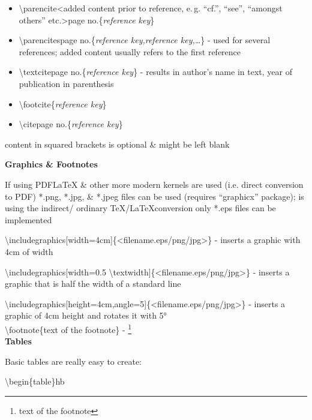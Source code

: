 \documentclass[a4paper,12pt,final]{article}
\begin{document}
\begin{itemize}
	\item \textbackslash parencite\lbrack <added content prior to reference, e.\,g. ``cf.'', ``see'', ``amongst others'' etc.>\rbrack\lbrack page no.\rbrack\{\textsl{reference key}\}
	\item \textbackslash parencites\lbrack<added content prior to reference>\rbrack \lbrack page no.\rbrack\{\textsl{reference key,reference key,\ldots}\} - used for several references; added content usually refers to the first reference 
	\item \textbackslash textcite\lbrack<added content prior to reference>\rbrack \lbrack page no.\rbrack\{\textsl{reference key}\} - results in author's name in text, year of publication in parenthesis 
	\item \textbackslash footcite\{\textsl{reference key}\}
	\item \textbackslash cite\lbrack <added content prior to reference>\rbrack\lbrack page no.\rbrack\{\textsl{reference key}\}
\end{itemize}

content in squared brackets is optional \& might be left blank 


\newpage
\large \textbf{Graphics \& Footnotes}
\normalsize

If using PDF\LaTeX{} \& other more modern kernels are used (i.e. direct conversion to PDF) *.png, *.jpg, \& *.jpeg files can be used (requires ``graphicx'' package); is using the indirect/ ordinary \TeX/\LaTeX conversion only *.eps files can be implemented 

\textbackslash includegraphics[width=4cm]\{<filename.eps/png/jpg>\} - inserts a graphic with 4cm of width 

\textbackslash includegraphics[width=0.5 \textbackslash textwidth]\{<filename.eps/png/jpg>\} - inserts a graphic that is half the width of a standard line 

\textbackslash includegraphics[height=4cm,angle=5]\{<filename.eps/png/jpg>\} - inserts a graphic of 4cm height and rotates it with 5° \\



\textbackslash footnote\{text of the footnote\} - \footnote{text of the footnote} \\


\large \textbf{Tables}
\normalsize

Basic tables are really easy to create: 

\textbackslash begin\{table\}\lbrack hb\rbrack
\end{document}
